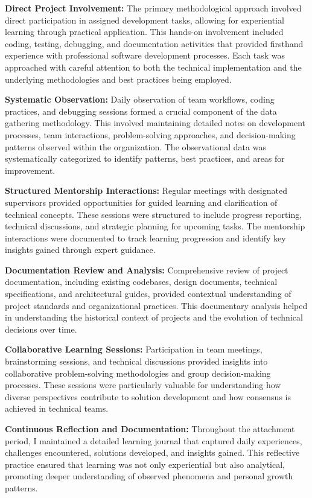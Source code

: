 \documentclass[12pt,a4paper]{article}
\begin{document}
\textbf{Direct Project Involvement:} The primary methodological approach involved direct participation in assigned development tasks, allowing for experiential learning through practical application. This hands-on involvement included coding, testing, debugging, and documentation activities that provided firsthand experience with professional software development processes. Each task was approached with careful attention to both the technical implementation and the underlying methodologies and best practices being employed.

\textbf{Systematic Observation:} Daily observation of team workflows, coding practices, and debugging sessions formed a crucial component of the data gathering methodology. This involved maintaining detailed notes on development processes, team interactions, problem-solving approaches, and decision-making patterns observed within the organization. The observational data was systematically categorized to identify patterns, best practices, and areas for improvement.

\textbf{Structured Mentorship Interactions:} Regular meetings with designated supervisors provided opportunities for guided learning and clarification of technical concepts. These sessions were structured to include progress reporting, technical discussions, and strategic planning for upcoming tasks. The mentorship interactions were documented to track learning progression and identify key insights gained through expert guidance.

\textbf{Documentation Review and Analysis:} Comprehensive review of project documentation, including existing codebases, design documents, technical specifications, and architectural guides, provided contextual understanding of project standards and organizational practices. This documentary analysis helped in understanding the historical context of projects and the evolution of technical decisions over time.

\textbf{Collaborative Learning Sessions:} Participation in team meetings, brainstorming sessions, and technical discussions provided insights into collaborative problem-solving methodologies and group decision-making processes. These sessions were particularly valuable for understanding how diverse perspectives contribute to solution development and how consensus is achieved in technical teams.

\textbf{Continuous Reflection and Documentation:} Throughout the attachment period, I maintained a detailed learning journal that captured daily experiences, challenges encountered, solutions developed, and insights gained. This reflective practice ensured that learning was not only experiential but also analytical, promoting deeper understanding of observed phenomena and personal growth patterns.
\end{document}
